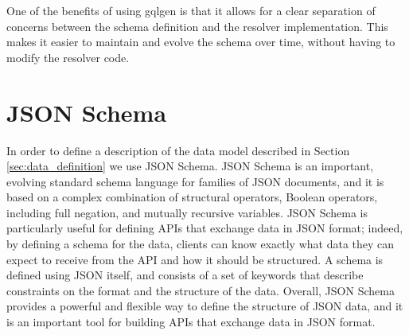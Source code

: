 One of the benefits of using gqlgen is that it allows for a clear separation of 
concerns between the schema definition and the resolver implementation. This makes it 
easier to maintain and evolve the schema over time, without having to modify the resolver code.

\section{JSON Schema}

In order to define a description of the data model described in Section \ref{sec:data_definition}
we use JSON Schema. JSON Schema is an important, evolving standard schema language for families of JSON documents, and it is based on a complex combination of structural operators, Boo\-le\-an operators, including full negation,  and mutually recursive variables. JSON Schema is particularly useful for defining APIs that exchange data in JSON 
format; indeed, by defining a schema for the data, clients can know exactly what data 
they can expect to receive from the API and how it should be structured.
A schema is defined using JSON itself, and consists of a set of keywords 
that describe constraints on the  format and the structure of the data. 
Overall, JSON Schema provides a powerful and flexible way to define the structure of 
JSON data, and it is an important tool for building APIs that exchange data in JSON format.
